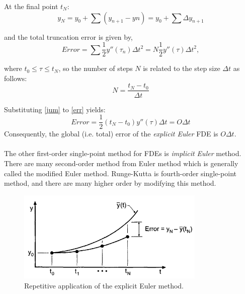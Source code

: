 \documentclass[paper=a4, fontsize=11pt]{scrartcl}
\numberwithin{equation}{section} %
\numberwithin{figure}{section} %
\numberwithin{table}{section} %
\begin{document}
At the final point $t_{N}$: 
\begin{equation}
y_{N} = y_{0} + \sum (y_{n+1} - y{n}) = y_{0} + \sum \Delta y_{n+1}
\end{equation}

and the total truncation error is given by,
\begin{equation}
\label{err}
Error = \sum \frac{1}{2} y'' (\tau_{n}) \Delta t^{2} = N \frac{1}{2} y'' (\tau) \Delta t^{2},
\end{equation}

where $t_{0} \leq \tau \leq t_{N}$, so the number of steps $N$ is related to the step size $\Delta t$ as follows:
\begin{equation}
\label{jum}
N = \frac{t_{N} - t_{0}}{\Delta t}
\end{equation}

Substituting \eqref{jum} to \eqref{err} yields:
\begin{equation}
Error = \frac{1}{2} (t_{N} - t_{0}) y'' (\tau) \Delta t = O \Delta t
\end{equation} 
Consequently, the global (i.e. total) error of the \textit{explicit Euler} FDE is $O \Delta t$.
\\
\\
The other first-order single-point method for FDEs is \textit{implicit Euler} method. There are many second-order method from Euler method  which is generally called the modified Euler method. Runge-Kutta is fourth-order single-point method, and there are many higher order by modifying this method.  

\begin{figure}
	\centering
	\includegraphics[width=0.8\textwidth]
		{eulerexplicit.png}
	\caption{Repetitive application of the explicit Euler method.}
	\label{fig:keplerian}
\end{figure}
\end{document}
